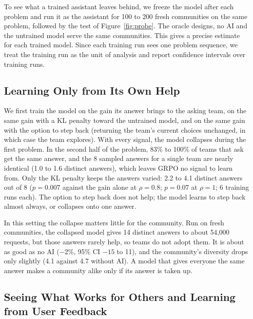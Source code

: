 \documentclass[11pt]{article}
\begin{document}
To see what a trained assistant leaves behind, we freeze the model after each problem and run it as the assistant for 100 to 200 fresh communities on the same problem, followed by the test of Figure~\ref{fig:probe}. The oracle designs, no AI and the untrained model serve the same communities. This gives a precise estimate for each trained model. Since each training run sees one problem sequence, we treat the training run as the unit of analysis and report confidence intervals over training runs.

\subsection{Learning Only from Its Own Help}

We first train the model on the gain its answer brings to the asking team, on the same gain with a KL penalty toward the untrained model, and on the same gain with the option to step back (returning the team's current choices unchanged, in which case the team explores). With every signal, the model collapses during the first problem. In the second half of the problem, 83\% to 100\% of teams that ask get the same answer, and the 8 sampled answers for a single team are nearly identical (1.0 to 1.6 distinct answers), which leaves GRPO no signal to learn from. Only the KL penalty keeps the answers varied: 2.2 to 4.1 distinct answers out of 8 ($p = 0.007$ against the gain alone at $\rho=0.8$; $p = 0.07$ at $\rho=1$; 6 training runs each). The option to step back does not help; the model learns to step back almost always, or collapses onto one answer.

In this setting the collapse matters little for the community. Run on fresh communities, the collapsed model gives 14 distinct answers to about 54{,}000 requests, but those answers rarely help, so teams do not adopt them. It is about as good as no AI ($-2$\%, 95\% CI $-15$ to 11), and the community's diversity drops only slightly (4.1 against 4.7 without AI). A model that gives everyone the same answer makes a community alike only if its answer is taken up.

\subsection{Seeing What Works for Others and Learning from User Feedback}
\end{document}
